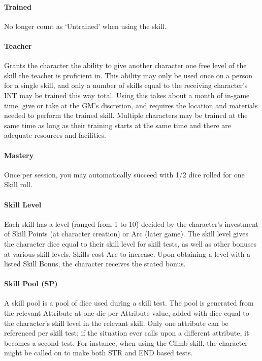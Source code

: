 \documentclass[oneside,11pt,english]{book}
\begin{document}
\paragraph{\label{par:Trained}Trained} No longer count as ‘Untrained’ when using the skill.
\paragraph{\label{par:Teacher}Teacher} Grants the character the ability to give another character one free level of the skill the teacher is proficient in. This ability may only be used once on a person for a single skill, and only a number of skills equal to the receiving character’s INT may be trained this way total. Using this takes about a month of in-game time, give or take at the GM’s discretion, and requires the location and materials needed to perform the trained skill. Multiple characters may be trained at the same time as long as their training starts at the same time and there are adequate resources and facilities.
\paragraph{\label{par:Mastery}Mastery} Once per session, you may automatically succeed with 1/2 dice rolled for one Skill roll.
\paragraph{\label{par:Skill Level}Skill Level} Each skill has a level (ranged from 1 to 10) decided by the character’s investment of Skill Points (at character creation) or Arc (later game). The skill level gives the character dice equal to their skill level for skill tests, as well as other bonuses at various skill levels. Skills cost Arc to increase. Upon obtaining a level with a listed Skill Bonus, the character receives the stated bonus.
\paragraph{\label{par:Skill Pool}Skill Pool (SP)} A skill pool is a pool of dice used during a skill test. The pool is generated from the relevant Attribute at one die per Attribute value, added with dice equal to the character’s skill level in the relevant skill. Only one attribute can be referenced per skill test; if the situation ever calls upon a different attribute, it becomes a second test. For instance, when using the Climb skill, the character might be called on to make both STR and END based tests.
\end{document}
